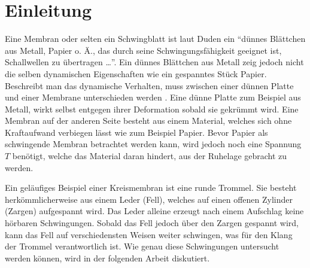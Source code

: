 %
%
%
\section{Einleitung\label{kreismembran:section:teil0}}
Eine Membran oder selten ein Schwingblatt ist laut Duden \cite{kreismembran:Duden:Membran} ein ``dünnes Blättchen aus Metall, Papier o. Ä., das durch seine Schwingungsfähigkeit geeignet ist, Schallwellen zu übertragen \dots''. 
Ein dünnes Blättchen aus Metall zeig jedoch nicht die selben dynamischen Eigenschaften wie ein gespanntes Stück Papier. 
Beschreibt man das dynamische Verhalten, muss zwischen einer dünnen Platte und einer Membrane unterschieden werden \cite{kreismembran:membrane_vs_thin_plate}. 
Eine dünne Platte zum Beispiel aus Metall, wirkt selbst entgegen ihrer Deformation sobald sie gekrümmt wird. 
Eine Membran auf der anderen Seite besteht aus einem Material, welches sich ohne Kraftaufwand verbiegen lässt wie zum Beispiel Papier. 
Bevor Papier als schwingende Membran betrachtet werden kann, wird jedoch noch eine Spannung $ T $ benötigt, welche das Material daran hindert, aus der Ruhelage gebracht zu werden. 

Ein geläufiges Beispiel einer Kreismembran ist eine runde Trommel. 
Sie besteht herkömmlicherweise aus einem Leder (Fell), welches auf einen offenen Zylinder (Zargen) aufgespannt wird. 
Das Leder alleine erzeugt nach einem Aufschlag keine hörbaren Schwingungen. 
Sobald das Fell jedoch über den Zargen gespannt wird, kann das Fell auf verschiedensten Weisen weiter schwingen, was für den Klang der Trommel verantwortlich ist. 
Wie genau diese Schwingungen untersucht werden können, wird in der folgenden Arbeit diskutiert.
	

